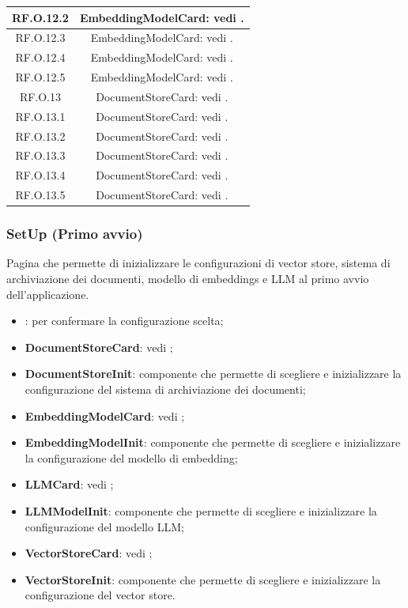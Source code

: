 \documentclass[10pt, a4paper]{article}
\begin{document}
\begin{xltabular}{\textwidth}{c|c}
\hline
RF.O.12.2 &  EmbeddingModelCard: vedi . \\
\hline
RF.O.12.3 &  EmbeddingModelCard: vedi . \\
\hline
RF.O.12.4 &  EmbeddingModelCard: vedi . \\
\hline
RF.O.12.5 &  EmbeddingModelCard: vedi . \\
\hline
RF.O.13 & DocumentStoreCard: vedi . \\ 
\hline
RF.O.13.1 & DocumentStoreCard: vedi . \\ 
\hline
RF.O.13.2 & DocumentStoreCard: vedi . \\ 
\hline
RF.O.13.3 & DocumentStoreCard: vedi . \\ 
\hline
RF.O.13.4 & DocumentStoreCard: vedi . \\ 
\hline
RF.O.13.5 & DocumentStoreCard: vedi . \\ 
\end{xltabular}



\subsubsection{SetUp (Primo avvio)}
Pagina che permette di inizializzare le configurazioni di vector store, sistema di archiviazione dei documenti, modello di embeddings e LLM al primo avvio dell'applicazione.
\begin{itemize}
    \item \label{ConfirmConfiguration}: per confermare la configurazione scelta;
    \item \textbf{DocumentStoreCard}: vedi ;
    \item \label{DocumentStoreInit}\textbf{DocumentStoreInit}: componente che permette di scegliere e inizializzare la configurazione del sistema di archiviazione dei documenti;
    \item \textbf{EmbeddingModelCard}: vedi ;
    \item \label{EmbeddingModelInit}\textbf{EmbeddingModelInit}: componente che permette di scegliere e inizializzare la configurazione del modello di embedding;
    \item \textbf{LLMCard}: vedi ;
    \item \label{LLMModelInit}\textbf{LLMModelInit}: componente che permette di scegliere e inizializzare la configurazione del modello LLM;
    \item \textbf{VectorStoreCard}: vedi ;
    \item \label{VectorStoreInit}\textbf{VectorStoreInit}: componente che permette di scegliere e inizializzare la configurazione del vector store.    
\end{itemize}
\end{document}
